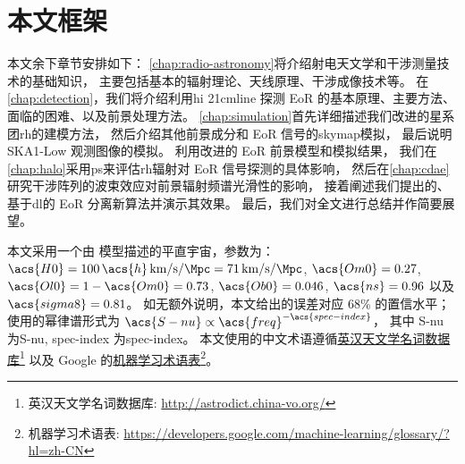 \section{本文框架}

本文余下章节安排如下：
\autoref{chap:radio-astronomy}将介绍射电天文学和干涉测量技术的基础知识，
主要包括基本的辐射理论、天线原理、干涉成像技术等。
在\autoref{chap:detection}，我们将介绍利用\ac{hi} \ac{21cmline}%
探测 EoR 的基本原理、主要方法、面临的困难、以及前景处理方法。
\autoref{chap:simulation}首先详细描述我们改进的星系团\ac{rh}的建模方法，
然后介绍其他前景成分和 EoR 信号的\ac{skymap}模拟，
最后说明 SKA1-Low 观测图像的模拟。
利用改进的 EoR 前景模型和模拟结果，
我们在\autoref{chap:halo}采用\ac{ps}来评估\ac{rh}辐射对 EoR 信号探测的具体影响，
然后在\autoref{chap:cdae}研究干涉阵列的波束效应对前景辐射频谱光滑性的影响，
接着阐述我们提出的、基于\ac{dl}的 EoR 分离新算法并演示其效果。
最后，我们对全文进行总结并作简要展望。

本文采用一个由 \lcdm 模型描述的平直宇宙，参数为：
$\acs{H0} = 100\,\acs{h}\,\si{\km\per\second\per\Mpc}
= \SI{71}{\km\per\second\per\Mpc}$,
$\acs{Om0} = 0.27$,
$\acs{Ol0} = 1 - \acs{Om0} = 0.73$,
$\acs{Ob0} = 0.046$,
$\acs{ns} = 0.96$ 以及 $\acs{sigma8} = 0.81$。
如无额外说明，本文给出的误差对应 68\% 的置信水平；
使用的幂律谱形式为 $\acs{S-nu} \propto \acs{freq}^{-\acs{spec-index}}$，
其中 \acs{S-nu} 为\acl{S-nu}, \acs{spec-index} 为\acl{spec-index}。
本文使用的中文术语遵循\href{%
  http://astrodict.china-vo.org/
}{英汉天文学名词数据库}\footnote{%
  英汉天文学名词数据库:
  \url{http://astrodict.china-vo.org/}}
以及 Google 的\href{%
  https://developers.google.com/machine-learning/glossary/?hl=zh-CN
}{机器学习术语表}\footnote{%
  机器学习术语表:
  \url{https://developers.google.com/machine-learning/glossary/?hl=zh-CN}}。


